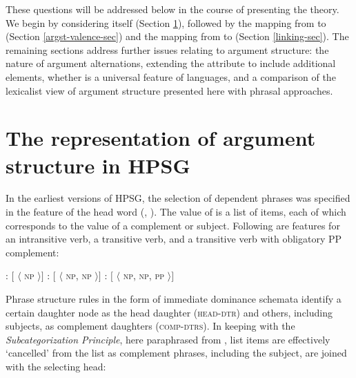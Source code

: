 \documentclass[output=paper
                ,modfonts
                ,nonflat
	        ,collection
	        ,collectionchapter
	        ,collectiontoclongg
 	        ,biblatex
                ,babelshorthands
                ,newtxmath
                ,draftmode
                ,colorlinks, citecolor=brown
]{./langsci/langscibook}
\begin{document}
\noindent
These questions will be addressed below in the course of presenting the theory.  We begin by considering \argst itself (Section \ref{sec:arg-st}), followed by the mapping from \argst to \val (Section \ref{argst-valence-sec}) and the mapping from \content to \argst (Section \ref{linking-sec}).  
The remaining sections address further issues relating to argument structure: the nature of argument alternations, extending the \argst attribute to include additional elements, whether \argst is a universal feature of languages, and a comparison of the lexicalist view of argument structure presented here with phrasal approaches.


\section{The representation of argument structure in HPSG}

\label{sec:arg-st}

In the earliest versions of HPSG, the selection of dependent phrases was specified in the \subcat feature  of the head word (\citealt{pollard+sag:1987}, \citealt[Chapter~1--8]{pollard+sag:1994}).  The value of \subcat is a list of items, each of which corresponds to the \synsem value of a complement or subject.  Following are \subcat features for an intransitive verb, a transitive verb, and a transitive verb with obligatory PP complement:


\begin{exe} 
\ex \label{subcats}
\begin{xlist}
\ex	{}:  $[$ \subcat $\langle$ \textsc{np} $\rangle ]$
\ex    {}:  $[$ \subcat $\langle$ \textsc{np}, \textsc{np} $\rangle ]$
\ex    {}:  $[$ \subcat $\langle$ \textsc{np}, \textsc{np}, \textsc{pp} $\rangle ]$
\end{xlist}
\end{exe}

\noindent
Phrase structure rules in the form of immediate dominance schemata  identify a certain daughter node as the head daughter (\textsc{head-dtr}) and others, including subjects, as complement daughters (\textsc{comp-dtrs}).  In keeping with the \emph{Subcategorization Principle},  here paraphrased from \cite[34]{pollard+sag:1994}, list items are effectively ‘cancelled’ from the \subcat list as complement phrases, including the subject, are joined with the selecting head:
\end{document}
